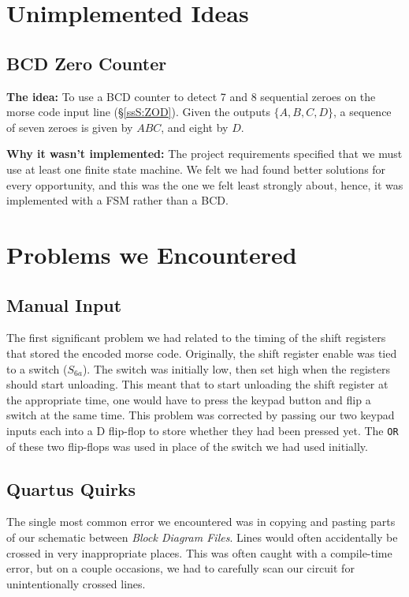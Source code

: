 \documentclass[11pt,letterpaper,titlepage]{article}
\begin{document}
\section{Unimplemented Ideas}
\subsection{BCD Zero Counter}

\textbf{The idea:} To use a BCD counter to detect 7 and 8 sequential zeroes on the morse code input line (\S\ref{ssS:ZOD}). Given the outputs $\{A, B, C, D\}$, a sequence of seven zeroes is given by $ABC$, and eight by $D$.

\noindent\textbf{Why it wasn't implemented:} The project requirements specified that we must use at least one finite state machine. We felt we had found better solutions for every opportunity, and this was the one we felt least strongly about, hence, it was implemented with a FSM rather than a BCD.


\section{Problems we Encountered}
\subsection{Manual Input}
The first significant problem we had related to the timing of the shift registers that stored the encoded morse code. Originally, the shift register enable was tied to a switch ($S_{6a}$). The switch was initially low, then set high when the registers should start unloading. This meant that to start unloading the shift register at the appropriate time, one would have to press the keypad button and flip a switch at the same time. This problem was corrected by passing our two keypad inputs each into a D flip-flop to store whether they had been pressed yet. The \texttt{OR} of these two flip-flops was used in place of the switch we had used initially.

\subsection{Quartus Quirks}
The single most common error we encountered was in copying and pasting parts of our schematic between \textit{Block Diagram Files}. Lines would often accidentally be crossed in very inappropriate places. This was often caught with a compile-time error, but on a couple occasions, we had to carefully scan our circuit for unintentionally crossed lines.
\end{document}
